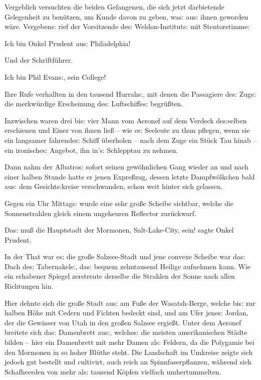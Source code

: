 \documentclass[oneside,12pt]{book}
\newcommand{\s}{s:}
\begin{document}
Vergeblich versuchten die beiden Gefangenen, die sich jetzt
darbietende Gelegenheit zu ben\"utzen, um Kunde davon zu geben,
wa{\s} au{\s} ihnen geworden w\"are. Vergeben{\s} rief der
Vorsitzende de{\s} Weldon-Institut{\s} mit Stentorstimme:

{\glqq}Ich bin Onkel Prudent au{\s} Philadelphia!{\grqq}

Und der Schriftf\"uhrer.

{\glqq}Ich bin Phil Evan{\s}, sein College!{\grqq}

Ihre Rufe verhallten in den tausend Hurrah{\s}, mit denen die
Passagiere de{\s} Zug{\s} die merkw\"urdige Erscheinung de{\s}
Luftschiffe{\s} begr\"u{\ss}ten.

Inzwischen waren drei bi{\s} vier Mann vom Aeronef auf dem Verdeck
de{\s}selben erschienen und Einer von ihnen lie{\ss} -- wie e{\s}
Seeleute zu thun pflegen, wenn sie ein langsamer fahrende{\s} Schiff
\"uberholen -- nach dem Zuge ein St\"uck Tau hinab -- ein
ironische{\s} Angebot, ihn in'{\s} Schlepptau zu nehmen.

Dann nahm der {\glqq}Albatro{\s}{\grqq} sofort seinen gew\"ohnlichen
Gang wieder an und nach einer halben Stunde hatte er jenen
Expre{\ss}zug, dessen letzte Dampfw\"olkchen bald au{\s} dem
Gesicht{\s}kreise verschwanden, schon weit hinter sich gelassen.

Gegen ein Uhr Mittag{\s} wurde eine sehr gro{\ss}e Scheibe sichtbar,
welche die Sonnenstrahlen gleich einem ungeheuren Reflector zur\"uckwarf.

{\glqq}Da{\s} mu{\ss} die Hauptstadt der Mormonen, Salt-Lake-City,
sein!{\grqq} sagte Onkel Prudent.

In der That war e{\s} die gro{\ss}e Salzsee-Stadt und jene convexe
Scheibe war da{\s} Dach de{\s} Tabernakel{\s}, da{\s} bequem
zehntausend Heilige aufnehmen kann. Wie ein erhabener Spiegel
zerstreute derselbe die Strahlen der Sonne nach allen Richtungen hin.

Hier dehnte sich die gro{\ss}e Stadt au{\s} am Fu{\ss}e der
Wasatsh-Berge, welche bi{\s} zur halben H\"ohe mit Cedern und Fichten
bedeckt sind, und am Ufer jene{\s} Jordan, der die Gew\"asser von
Utah in den gro{\ss}en Salzsee ergie{\ss}t. Unter dem Aeronef
breitete sich da{\s} Damenbrett au{\s}, welche{\s} die meisten
amerikanischen St\"adte bilden -- hier ein Damenbrett mit {\glqq}mehr
Damen al{\s} Feldern{\grqq}, da die Polygamie bei den Mormonen in so
hoher Bl\"uthe steht. Die Landschaft im Umkreise zeigte sich jedoch
gut bestellt und cultivirt, auch reich an Spinnfaserpflanzen,
w\"ahrend sich Schafheerden von mehr al{\s} tausend K\"opfen vielfach
umhertummelten.
\end{document}
